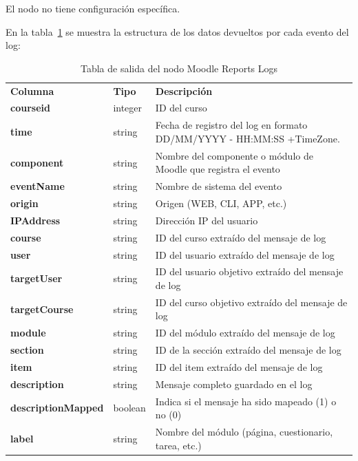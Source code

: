El nodo no tiene configuración específica. 
\

En la tabla~\ref{tab:moodle_reports_logs_desc} se muestra la estructura de los datos devueltos por cada evento del log: 

\begin{table}[!h]
	\begin{center}
		\begin{tabular}{p{}p{}p{}}
			\toprule
			\textbf{Columna} & \textbf{Tipo} & \textbf{Descripción}\\
			\otoprule
			\textbf{courseid} & integer & ID del curso \\
         \hline
			\textbf{time} & string & Fecha de registro del log en formato DD/MM/YYYY - HH:MM:SS +TimeZone. \\
         \hline
         \textbf{component} & string & Nombre del componente o módulo de Moodle que registra el evento \\
         \hline
         \textbf{eventName} & string & Nombre de sistema del evento \\
         \hline
         \textbf{origin} & string & Origen (WEB, CLI, APP, etc.) \\
         \hline
         \textbf{IPAddress} & string & Dirección IP del usuario \\
         \hline
         \textbf{course} & string & ID del curso extraído del mensaje de log \\
         \hline
         \textbf{user} & string & ID del usuario extraído del mensaje de log \\
         \hline
         \textbf{targetUser} & string & ID del usuario objetivo extraído del mensaje de log \\
         \hline
         \textbf{targetCourse} & string &  ID del curso objetivo extraído del mensaje de log \\
         \hline
         \textbf{module} & string &  ID del módulo extraído del mensaje de log \\
         \hline
         \textbf{section} & string &  ID de la sección extraído del mensaje de log \\
         \hline
         \textbf{item} & string &  ID del item extraído del mensaje de log \\
         \hline
         \textbf{description} & string & Mensaje completo guardado en el log \\
         \hline
         \textbf{descriptionMapped} & boolean &  Indica si el mensaje ha sido mapeado (1) o no (0)\\
         \hline
         \textbf{label} & string & Nombre del módulo (página, cuestionario, tarea, etc.) \\
         \bottomrule
		\end{tabular}
	\end{center}
	\caption{Tabla de salida del nodo Moodle Reports Logs}
	\label{tab:moodle_reports_logs_desc}
\end{table}
\FloatBarrier

